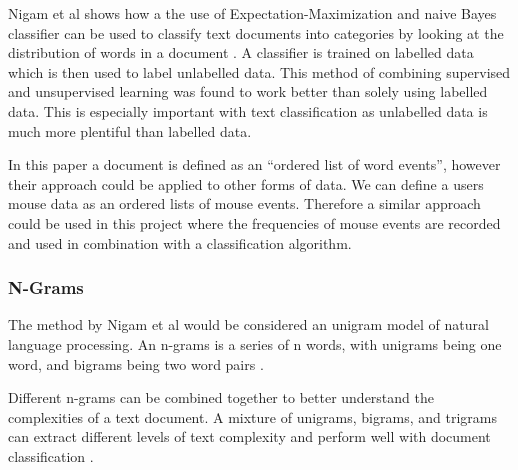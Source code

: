 \documentclass{article}
\begin{document}
Nigam et al shows how a the use of Expectation-Maximization and naive Bayes classifier can be used to classify text documents into categories by looking at the distribution of words in a document \cite{nigam2000text}.
A classifier is trained on labelled data which is then used to label unlabelled data.
This method of combining supervised and unsupervised learning was found to work better than solely using labelled data.
This is especially important with text classification as unlabelled data is much more plentiful than labelled data.

In this paper a document is defined as an ``ordered list of word events'', however their approach could be applied to other forms of data.
We can define a users mouse data as an ordered lists of mouse events.
Therefore a similar approach could be used in this project where the frequencies of mouse events are recorded and used in combination with a classification algorithm.

\subsubsection{N-Grams}

The method by Nigam et al would be considered an unigram model of natural language processing.
An n-grams is a series of n words, with unigrams being one word, and bigrams being two word pairs \cite{keselj2009speech}.

Different n-grams can be combined together to better understand the complexities of a text document.
A mixture of unigrams, bigrams, and trigrams can extract different levels of text complexity and perform well with document classification \cite{aggarwal2012survey}.



\end{document}
